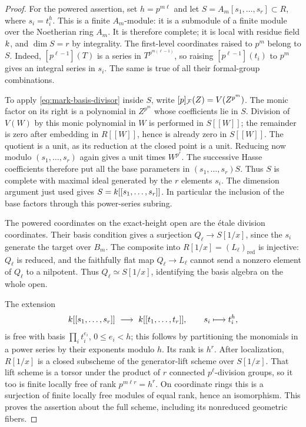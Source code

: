 \begin{proof}
For the powered assertion, set $h=p^{m\ell}$ and let
$S=A_m[s_1,\ldots,s_r]\subset R$, where $s_i=t_i^h$.  This is a
finite $A_m$-module: it is a submodule of a finite module over the
Noetherian ring $A_m$.  It is therefore complete; it is local with
residue field $k$, and $\dim S=r$ by integrality.  The first-level
coordinates raised to $p^m$ belong to $S$.  Indeed,
$[p^{\ell-1}](T)$ is a series in $T^{p^{m(\ell-1)}}$, so raising
$[p^{\ell-1}](t_i)$ to $p^m$ gives an integral series in $s_i$.
The same is true of all their formal-group combinations.

To apply \cref{eq:mark-basis-divisor} inside $S$, write
$[p]_{\mathcal F}(Z)=V(Z^{p^m})$.  The monic factor on its right is a
polynomial in $Z^{p^m}$ whose coefficients lie in $S$.  Division of
$V(W)$ by this monic polynomial in $W$ is performed in $S[[W]]$;
the remainder is zero after embedding in $R[[W]]$, hence is already
zero in $S[[W]]$.  The quotient is a unit, as its reduction at the
closed point is a unit.  Reducing now modulo $(s_1,\ldots,s_r)$
again gives a unit times $W^{p^r}$.  The successive Hasse
coefficients therefore put all the base parameters in $(s_1,\ldots,s_r)S$.
Thus $S$ is complete with maximal ideal generated by the $r$
elements $s_i$.  The dimension argument just used gives
$S=k[[s_1,\ldots,s_r]]$.  In particular the inclusion of the base
factors through this power-series subring.

The powered coordinates on the exact-height open are the \'{e}tale
division coordinates.  Their basis condition gives a surjection
$Q_\ell\to S[1/x]$, since the $s_i$ generate the target over $B_m$.
The composite into $R[1/x]=(L_\ell)_{\mathrm{red}}$ is injective:
$Q_\ell$ is reduced, and the faithfully flat map
$Q_\ell\to L_\ell$ cannot send a nonzero element of $Q_\ell$ to
a nilpotent.  Thus $Q_\ell\simeq S[1/x]$, identifying the basis
algebra on the whole open.

The extension
\[
 \kk[[s_1,\ldots,s_r]]\ \longrightarrow\
 \kk[[t_1,\ldots,t_r]],\qquad s_i\longmapsto t_i^h,
\]
is free with basis $\prod_i t_i^{e_i}$, $0\leq e_i<h$; this follows
by partitioning the monomials in a power series by their exponents
modulo $h$.  Its rank is $h^r$.  After localization, $R[1/x]$ is a
closed subscheme of the generator-lift scheme over $S[1/x]$.  That
lift scheme is a torsor under the product of $r$ connected
$p^\ell$-division groups, so it too is finite locally free of rank
$p^{m\ell r}=h^r$.  On coordinate rings this is a surjection of
finite locally free modules of equal rank, hence an isomorphism.
This proves the assertion about the full scheme, including its
nonreduced geometric fibers.


\end{proof}
